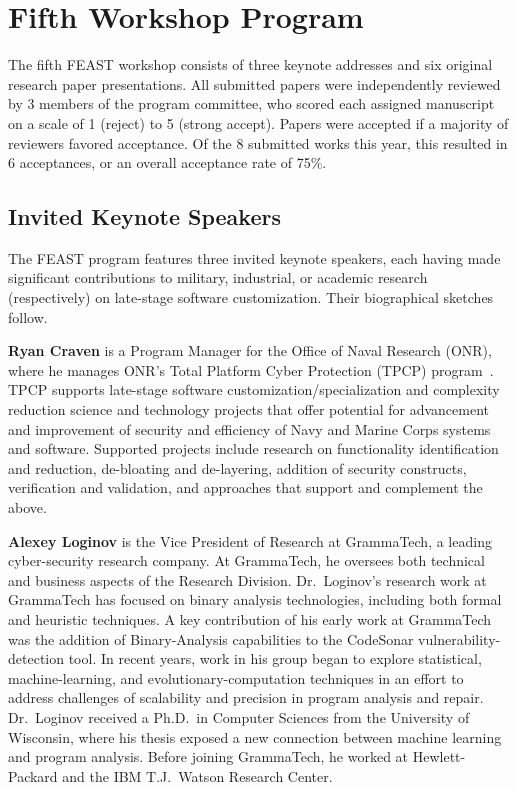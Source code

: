 \documentclass[sigconf]{acmart}
\newcommand\bio[1]{\noindent\textbf{#1}}
\begin{document}
\section{Fifth Workshop Program}
The fifth FEAST workshop consists of three keynote addresses and six original research paper presentations.
All submitted papers were independently reviewed by 3 members of the program committee, who scored each assigned manuscript on a scale of 1 (reject) to 5 (strong accept).
Papers were accepted if a majority of reviewers favored acceptance.
Of the 8 submitted works this year, this resulted in 6 acceptances, or an overall acceptance rate of 75\%.

\subsection{Invited Keynote Speakers}

The FEAST program features three invited keynote speakers,
each having made significant contributions to
military, industrial, or academic research (respectively)
on late-stage software customization.
Their biographical sketches follow.

\medskip

\bio{Ryan Craven}
is a Program Manager for the Office of Naval Research (ONR),
where he manages ONR's Total Platform Cyber Protection (TPCP) program~\cite{tpcp}.
TPCP supports late-stage software customization/specialization and complexity reduction science and technology projects that offer potential for advancement and improvement of security and efficiency of Navy and Marine Corps systems and software.
Supported projects include research on
functionality identification and reduction,
de-bloating and de-layering,
addition of security constructs,
verification and validation,
and approaches that support and complement the above.

\medskip

\bio{Alexey Loginov}
is the Vice President of Research at GrammaTech, a leading cyber-security research company.
At GrammaTech, he oversees both technical and business aspects of the Research Division.
Dr.~Loginov's research work at GrammaTech has focused on binary analysis technologies, including both formal and heuristic techniques.
A key contribution of his early work at GrammaTech was the addition of Binary-Analysis capabilities to the CodeSonar vulnerability-detection tool.
In recent years, work in his group began to explore statistical, machine-learning, and evolutionary-computation techniques in an effort to address challenges of scalability and precision in program analysis and repair.
Dr.~Loginov received a Ph.D.~in Computer Sciences from the University of Wisconsin, where his thesis exposed a new connection between machine learning and program analysis.
Before joining GrammaTech, he worked at Hewlett-Packard and the IBM T.J.~Watson Research Center.
\end{document}
